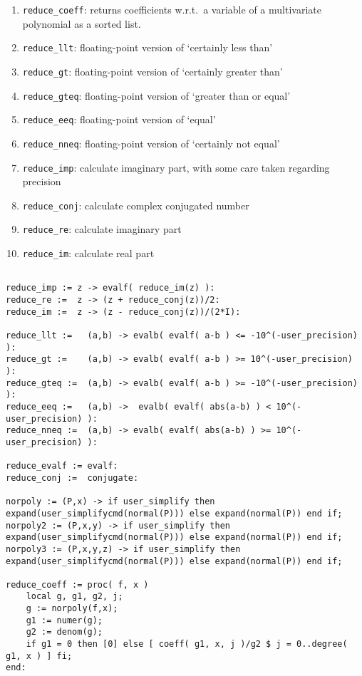 \documentclass[a4paper,10pt]{article}
\begin{document}
\begin{enumerate}
\item   \verb+reduce_coeff+: returns coefficients w.r.t.~a variable of a multivariate polynomial as a sorted list.
\item   \verb+reduce_llt+: floating-point version of `certainly less than'
\item   \verb+reduce_gt+: floating-point version of `certainly greater than'
\item   \verb+reduce_gteq+: floating-point version of `greater than or equal'
\item   \verb+reduce_eeq+: floating-point version of `equal'
\item   \verb+reduce_nneq+: floating-point version of `certainly not equal'
\item   \verb+reduce_imp+: calculate imaginary part, with some care taken regarding precision
\item   \verb+reduce_conj+: calculate complex conjugated number
\item   \verb+reduce_re+: calculate imaginary part
\item   \verb+reduce_im+: calculate real part
\end{enumerate}

\begin{lstlisting}[name=tools]

reduce_imp := z -> evalf( reduce_im(z) ):
reduce_re :=  z -> (z + reduce_conj(z))/2:
reduce_im :=  z -> (z - reduce_conj(z))/(2*I):

reduce_llt :=   (a,b) -> evalb( evalf( a-b ) <= -10^(-user_precision) ):
reduce_gt :=    (a,b) -> evalb( evalf( a-b ) >= 10^(-user_precision) ):
reduce_gteq :=  (a,b) -> evalb( evalf( a-b ) >= -10^(-user_precision) ):
reduce_eeq :=   (a,b) ->  evalb( evalf( abs(a-b) ) < 10^(-user_precision) ):
reduce_nneq :=  (a,b) -> evalb( evalf( abs(a-b) ) >= 10^(-user_precision) ):

reduce_evalf := evalf:
reduce_conj :=  conjugate:

norpoly := (P,x) -> if user_simplify then expand(user_simplifycmd(normal(P))) else expand(normal(P)) end if;
norpoly2 := (P,x,y) -> if user_simplify then expand(user_simplifycmd(normal(P))) else expand(normal(P)) end if;
norpoly3 := (P,x,y,z) -> if user_simplify then expand(user_simplifycmd(normal(P))) else expand(normal(P)) end if;

reduce_coeff := proc( f, x )
    local g, g1, g2, j;
    g := norpoly(f,x);
    g1 := numer(g);
    g2 := denom(g);
    if g1 = 0 then [0] else [ coeff( g1, x, j )/g2 $ j = 0..degree( g1, x ) ] fi;
end:
\end{lstlisting}
\end{document}
